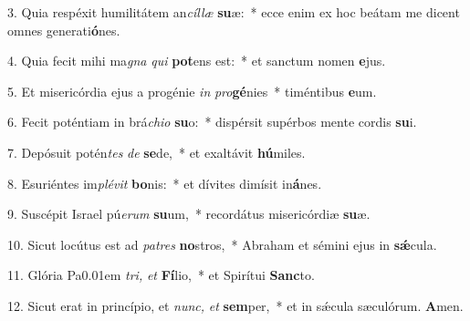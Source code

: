 \item 3. Quia respéxit humilitátem an\textit{cíllæ} \textbf{su}æ:~* ecce enim ex hoc beátam me dicent omnes generati\textbf{ó}nes.

\item 4. Quia fecit mihi ma\textit{gna} \textit{qui} \textbf{pot}ens est:~* et sanctum nomen \textbf{e}jus.

\item 5. Et misericórdia ejus a progénie \textit{in} \textit{pro}\textbf{gé}nies~* timéntibus \textbf{e}um.

\item 6. Fecit poténtiam in brá\textit{chio} \textbf{su}o:~* dispérsit supérbos mente cordis \textbf{su}i.

\item 7. Depósuit potén\textit{tes} \textit{de} \textbf{se}de,~* et exaltávit \textbf{hú}miles.

\item 8. Esuriéntes im\textit{plévit} \textbf{bo}nis:~* et dívites dimísit in\textbf{á}nes.

\item 9. Suscépit Israel pú\textit{erum} \textbf{su}um,~* recordátus misericórdiæ \textbf{su}æ.

\item 10. Sicut locútus est ad \textit{patres} \textbf{no}stros,~* Abraham et sémini ejus in \textbf{sǽ}cula.

\item 11. Glória Pa\kern 0.01em \textit{tri,} \textit{et} \textbf{Fí}lio,~* et Spirítui \textbf{Sanc}to.

\item 12. Sicut erat in princípio, et \textit{nunc,} \textit{et} \textbf{sem}per,~* et in sǽcula sæculórum. \textbf{A}men.